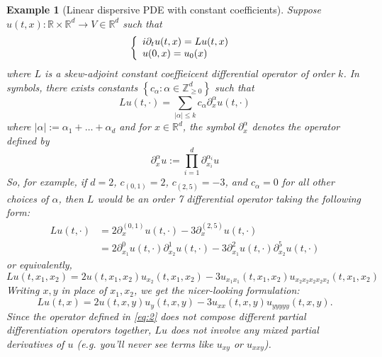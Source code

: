 \documentclass{article}
\makeatletter
\newtheorem{example}{Example}
\def\R{\mathbb{R}} %
\def\Z{\mathbb{Z}} %
\newcommand{\curly}[2]{\left\{ \begin{array}{l@{\quad}l}#1\\#2\end{array}\right.}
\makeatother
\begin{document}
\begin{example}[Linear dispersive PDE with constant coefficients] \label{ex:linear-dispersive-pde-with-constant-coefficients}
  Suppose $u(t,x):\R\times\R^{d}\to V \in \R^{d}$ such that
  \begin{equation}
    \label{eq:linear-constant-coefficient-pde}
    \curly{i\partial_{t}u(t,x)=Lu(t,x)}{u(0,x)=u_{0}(x)}
  \end{equation}
  where $L$ is a skew-adjoint constant coeffieicent differential operator of
  order $k$. In symbols, there exists constants $\left\{c_{\alpha}: \alpha\in
    \Z_{\geq 0}^{d}\right\}$ such that
  \begin{equation*}
    Lu(t,\cdot) = \sum_{|\alpha| \leq k}c_{\alpha} \partial_{x}^{\alpha}u(t,\cdot)
  \end{equation*}
  where $|\alpha| := \alpha_{1}+\ldots+\alpha_{d}$ and for $x\in \R^{d}$, the
  symbol $\partial_{x}^{\alpha}$ denotes the operator defined by
  \begin{equation}
    \label{eq:2} 
    \partial_{x}^{\alpha}u := \prod_{i=1}^{d} \partial_{x_{i}}^{\alpha_{i}}u
  \end{equation}
  So, for example, if $d=2$, $c_{(0,1)}=2$, $c_{(2,5)}=-3$, and
  $c_{\alpha}=0$ for all other choices of $\alpha$, then $L$ would be an order 7
  differential operator taking the following form:
  \begin{align*} 
    Lu(t,\cdot)
    &= 2 \partial_{x}^{(0,1)}u(t,\cdot)-3 \partial_{x}^{(2,5)}u(t,\cdot)\\
    &= 2\partial_{x_{1}}^{0}u(t,\cdot)\partial_{x_{2}}^{1}u(t,\cdot) -3\partial_{x_{1}}^{2}u(t,\cdot)\partial_{x_{2}}^{5}u(t,\cdot)
  \end{align*}
  or equivalently,
  \begin{equation*}
    Lu(t,x_{1},x_{2}) = 2u(t,x_{1},x_{2})u_{x_{2}}(t,x_{1},x_{2}) -3u_{x_{1}x_{1}}(t,x_{1},x_{2})u_{x_{2}x_{2}x_{2}x_{2}x_{2}}(t,x_{1},x_{2})
  \end{equation*}
  Writing $x,y$ in place of $x_{1},x_{2}$, we get the nicer-looking formulation:
  \begin{equation*}
    Lu(t,x) = 2u(t,x,y)u_{y}(t,x,y)-3u_{xx}(t,x,y)u_{yyyyy}(t,x,y).
  \end{equation*}
  Since the operator defined in \cref{eq:2} does not compose different partial
  differentiation operators together, $Lu$ does not involve any mixed partial derivatives of $u$ (e.g.
  you'll never see terms like $u_{xy}$ or $u_{xxy}$).
\end{example}
\end{document}

